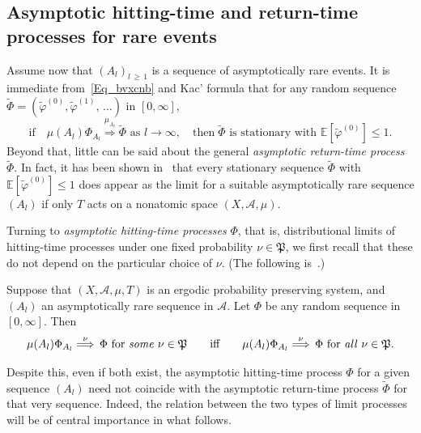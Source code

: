\documentclass[AHL,Unicode,longabstracts]{cedram}
\newcommand{\clA}{\mathcal{A}}
\newcommand{\frkP}{\mathfrak{P}}
\newcommand{\bbE}{\mathbb{E}}
\begin{document}
\subsection{Asymptotic hitting-time and return-time processes for rare events}
Assume now that $(A_{l})_{l\,\geq\,1}$ is a sequence of asymptotically rare events. It is immediate from~\eqref{Eq_bvxcnb} and Kac' formula that for any random sequence $\widetilde{\Phi}=(\widetilde{\varphi}^{(0)},\widetilde {\varphi}^{(1)},\,\ldots)$ in $[0,\infty]$,
\begin{equation}\label{Eq_BasicPropsAsyRetProc}
\text{if}\quad\mu(A_{l})\Phi_{A_{l}}\overset{\mu_{A_{l}}}{\Longrightarrow }\widetilde{\Phi}\text{ as }l\rightarrow\infty,\quad \text{then}\;\widetilde{\Phi}\text{ is stationary with }\bbE\left[\widetilde{\varphi}^{(0)}\right]\leq1. 
\end{equation}
Beyond that, little can be said about the general \emph{asymptotic return-time process} $\widetilde{\Phi}$. In fact, it has been shown in~\cite{Z11} that every stationary sequence $\widetilde{\Phi}$ with $\bbE[\widetilde {\varphi}^{(0)}]\leq1$ does appear as the limit for a suitable asymptotically rare sequence $(A_{l})$ if only $T$ acts on a nonatomic space $(X,\clA,\mu)$.

Turning to \emph{asymptotic hitting-time processes} $\Phi$, that is, distributional limits of hitting-time processes under one fixed probability $\nu\in\frkP$, we first recall that these do not depend on the particular choice of $\nu$. (The following is~\cite[Corollary~6]{Z7}.)

\begin{prop}\label{P_SDCforHittiPs}
Suppose that $(X,\clA,\mu,T)$ is an ergodic probability preserving system, and $(A_{l})$ an asymptotically rare sequence in $\clA$. Let $\Phi$ be any random sequence in $[0,\infty]$. Then
\begin{equation}
\mu(A_{l})\Phi_{A_{l}}\overset{\nu}{\Longrightarrow}\,\Phi\text{ for
\emph{some} }\nu\in\frkP\qquad\text{iff}\qquad\mu(A_{l})\Phi_{A_{l} }\overset{\nu}{\Longrightarrow}\,\Phi\text{ for \emph{all} }\nu\in
\frkP.
\end{equation}
\end{prop}

Despite this, even if both exist, the asymptotic hitting-time process $\Phi$ for a given sequence $(A_{l})$ need not coincide with the asymptotic return-time process $\widetilde{\Phi}$ for that very sequence. Indeed, the relation between the two types of limit processes will be of central importance in what follows.
\end{document}
